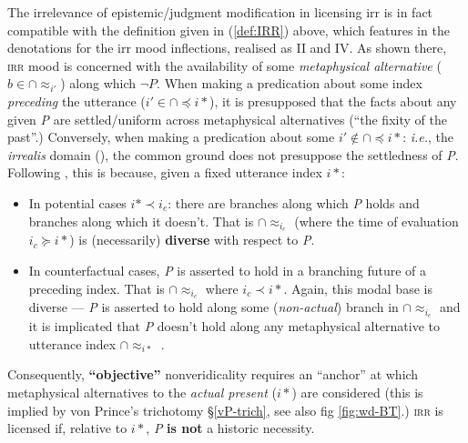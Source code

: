 The irrelevance of epistemic/judgment modification in licensing \gls{irr} is in fact compatible with the definition given in (\ref{def:IRR}) above, which features in the denotations for the \gls{irr} mood inflections, realised as \gls{II} and \gls{IV}. As shown there, \textsc{irr} mood is concerned with the availability of some \textit{metaphysical alternative} ($ b\in\cap{\approx_{i'}} $) along which $ \neg\textit{P} $. When making a predication about some index \textit{preceding} the utterance ($ i'\in\cap{\preccurlyeq}i* $), it is presupposed that the facts about any given \textit{P} are settled/uniform across metaphysical alternatives (``the fixity of the past''.) Conversely, when making a predication about some $ i'\notin\cap{\preccurlyeq}i* $: \textit{i.e.}, the \textit{irrealis} domain (\citealp{VonPrincea}), the common ground does not presuppose the settledness of \textit{P}. Following \citet[ \S~4]{Condoravdi2002}, this is because, given a fixed utterance index $ i* $:
\begin{itemize}
	\item In potential cases $ i*\prec i_e $: there are branches along which \textit{P} holds and branches along which it doesn't. That is $ \cap{\approx_{i_c}} $ (where the time of evaluation $ i_c\succcurlyeq i* $) is (necessarily) \textbf{diverse} with respect to \textit{P}.
	\item In counterfactual cases, \textit{P} is asserted to hold in a branching future of a preceding index. That is $ \cap{\approx_{i_c}} $ where $ i_c\prec i* $. Again, this modal base is diverse --- \textit{P} is asserted to hold along some (\textit{non-actual}) branch in $ \cap{\approx_{i_c}} $ and it is implicated that \textit{P} doesn't hold along any metaphysical alternative to utterance index $ \cap{\approx_{i*}} $ \citep[86]{Condoravdi2002}.
\end{itemize}

Consequently, \textbf{``objective''} nonveridicality requires an ``anchor'' at which metaphysical alternatives to the \textit{actual present} ($ i* $) are considered (this is implied by von Prince's trichotomy \S \ref{vP-trich}, see also fig \ref{fig:wd-BT}.) \textsc{irr} is licensed if, relative to $ i* $, \textit{P} \textbf{is not} a historic necessity.


%
%
%
%
%



